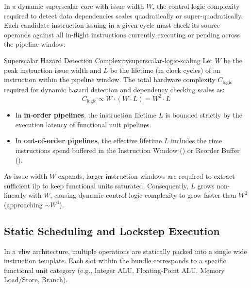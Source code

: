 In a dynamic superscalar core with issue width $W$, the control logic complexity required to detect data dependencies scales quadratically or super-quadratically. Each candidate instruction issuing in a given cycle must check its source operands against all in-flight instructions currently executing or pending across the pipeline window:

\begin{definition}{Superscalar Hazard Detection Complexity}{superscalar-logic-scaling}
    Let $W$ be the peak instruction issue width and $L$ be the lifetime (in clock cycles) of an instruction within the pipeline window. The total hardware complexity $C_{\text{logic}}$ required for dynamic hazard detection and dependency checking scales as:
    \begin{equation}
        C_{\text{logic}} \propto W \cdot (W \cdot L) = W^2 \cdot L
    \end{equation}
    \begin{itemize}
        \item In \textbf{in-order pipelines}, the instruction lifetime $L$ is bounded strictly by the execution latency of functional unit pipelines.
        \item In \textbf{out-of-order pipelines}, the effective lifetime $L$ includes the time instructions spend buffered in the Instruction Window () or Reorder Buffer ().
    \end{itemize}
\end{definition}

As issue width $W$ expands, larger instruction windows are required to extract sufficient \gls{ilp} to keep functional units saturated. Consequently, $L$ grows non-linearly with $W$, causing dynamic control logic complexity to grow faster than $W^2$ (approaching $\sim W^3$).

\subsection{Static Scheduling and Lockstep Execution}

In a \gls{vliw} architecture, multiple operations are statically packed into a single wide instruction template. Each slot within the bundle corresponds to a specific functional unit category (e.g., Integer ALU, Floating-Point ALU, Memory Load/Store, Branch).

